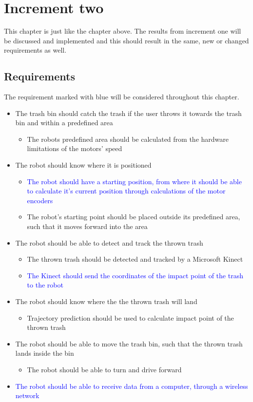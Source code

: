 \chapter{Increment two}
\label{chap:Increment two}
This chapter is just like the chapter above. The results from increment one will be discussed and implemented and this should result in the same, new or changed requirements as well.  

\section{Requirements}
\label{sec:i2Requirements}
The requirement marked with blue will be considered throughout this chapter.

\begin{itemize}
	\item The trash bin should catch the trash if the user throws it towards the trash bin and within a predefined area
	\begin{itemize}
		\item {The robots predefined area should be calculated from the hardware limitations of the motors’ speed}
	\end{itemize}
	\item The robot should know where it is positioned
	\begin{itemize}
		\item \textcolor{blue}{The robot should have a starting position, from where it should be able to calculate it's current position through calculations of the motor encoders}
		\item {The robot's starting point should be placed outside its predefined area, such that it moves forward into the area}
	\end{itemize}
	\item The robot should be able to detect and track the thrown trash
	\begin{itemize}
		\item {The thrown trash should be detected and tracked by a Microsoft Kinect}
		\item \textcolor{blue}{The Kinect should send the coordinates of the impact point of the trash to the robot}
	\end{itemize}
	\item The robot should know where the the thrown trash will land
	\begin{itemize}
		\item {Trajectory prediction should be used to calculate impact point of the thrown trash}
	\end{itemize}
	\item The robot should be able to move the trash bin, such that the thrown trash lands inside the bin
	\begin{itemize}
		\item {The robot should be able to turn and drive forward}
	\end{itemize}
	\item \textcolor{blue}{The robot should be able to receive data from a computer, through a wireless network}
\end{itemize}

